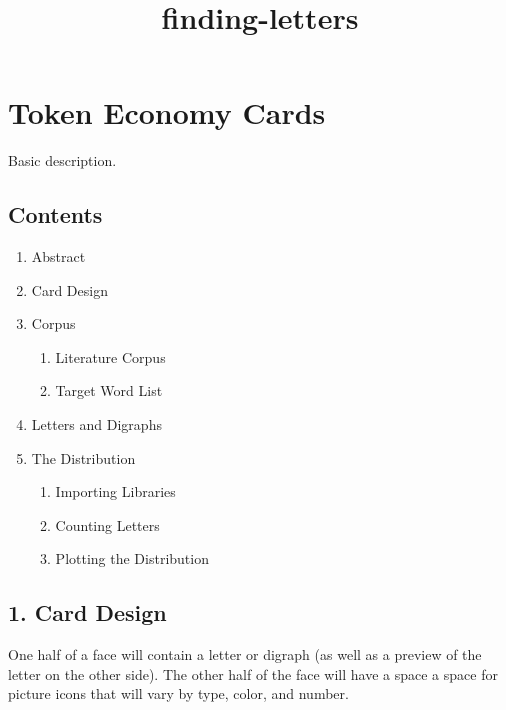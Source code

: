 \documentclass[11pt]{article}
\title{finding-letters}
\providecommand{\tightlist}{%
      \setlength{\itemsep}{0pt}\setlength{\parskip}{0pt}}
\begin{document}
    
    
    \maketitle
    
    

    
    \section{Token Economy Cards}\label{token-economy-cards}

Basic description.

\subsection{Contents}\label{contents}

\begin{enumerate}
\def\labelenumi{\arabic{enumi}.}
\tightlist
\item
  Abstract
\item
  Card Design
\item
  Corpus

  \begin{enumerate}
  \def\labelenumii{\arabic{enumii}.}
  \tightlist
  \item
    Literature Corpus
  \item
    Target Word List
  \end{enumerate}
\item
  Letters and Digraphs
\item
  The Distribution

  \begin{enumerate}
  \def\labelenumii{\arabic{enumii}.}
  \tightlist
  \item
    Importing Libraries
  \item
    Counting Letters
  \item
    Plotting the Distribution
  \end{enumerate}
\end{enumerate}

    \subsection{1. Card Design}\label{card-design}

One half of a face will contain a letter or digraph (as well as a
preview of the letter on the other side). The other half of the face
will have a space a space for picture icons that will vary by type,
color, and number.
\end{document}
